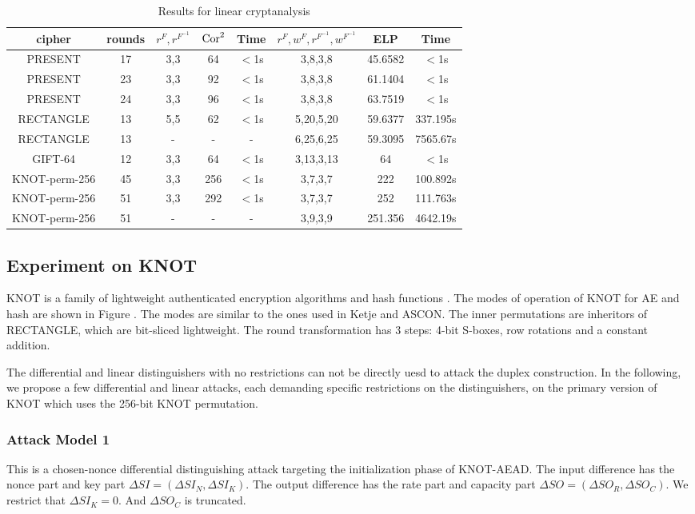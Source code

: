 \begin{table}
	\caption{Results for linear cryptanalysis}\label{tab:ELP}
	\centering
	\begin{tabular}{|c|c|c|c|c|c|c|c|}
		\hline
		cipher & rounds & $r^F,r^{F^{-1}}$ & $\text{Cor}^2$ & Time & $r^F,w^F,r^{F^{-1}},w^{F^{-1}}$ & ELP & Time \\
		\hline
		PRESENT & 17 & 3,3 & 64 & $<$1s & 3,8,3,8 & 45.6582 & $<$1s\\
		\hline 
		PRESENT & 23 & 3,3 & 92 & $<$1s & 3,8,3,8 & 61.1404 & $<$1s\\
		\hline 
		PRESENT & 24 & 3,3 & 96 & $<$1s & 3,8,3,8 & 63.7519 & $<$1s\\
		\hline 
		RECTANGLE & 13 & 5,5 & 62 & $<$1s & 5,20,5,20 & 59.6377 & 337.195s \\
		\hline
		RECTANGLE & 13 & - & - & - & 6,25,6,25 & 59.3095 & 7565.67s \\
		\hline
		GIFT-64 & 12 & 3,3 & 64 & $<$1s& 3,13,3,13 & 64 & $<$1s \\
		\hline
		KNOT-perm-256 & 45 & 3,3 & 256 & $<$1s & 3,7,3,7 & 222 & 100.892s\\
		KNOT-perm-256 & 51 & 3,3 & 292 & $<$1s & 3,7,3,7 & 252 & 111.763s\\
		KNOT-perm-256 & 51 & - & - & - & 3,9,3,9 & 251.356 & 4642.19s\\
		\hline
	\end{tabular}
\end{table}

\subsection{Experiment on KNOT}

KNOT is a family of lightweight authenticated encryption algorithms and hash functions \cite{ZDY19}. The modes of operation of KNOT for AE and hash are shown in Figure . The modes are similar to the ones used in Ketje and ASCON. The inner permutations are inheritors of RECTANGLE, which are bit-sliced lightweight. The round transformation has 3 steps: 4-bit S-boxes, row rotations and a constant addition. 

The differential and linear distinguishers with no restrictions can not be directly uesd to attack the duplex construction. In the following, we propose a few differential and linear attacks, each demanding specific restrictions on the distinguishers, on the primary version of KNOT which uses the 256-bit KNOT permutation.

\subsubsection{Attack Model 1}
This is a chosen-nonce differential distinguishing attack targeting the initialization phase of KNOT-AEAD. The input difference has the nonce part and key part $\Delta SI=(\Delta SI_N,\Delta SI_K)$. The output difference has the rate part and capacity part $\Delta SO=(\Delta SO_R,\Delta SO_C)$. We restrict that $\Delta SI_K=0$. And $\Delta SO_C$ is truncated.  

